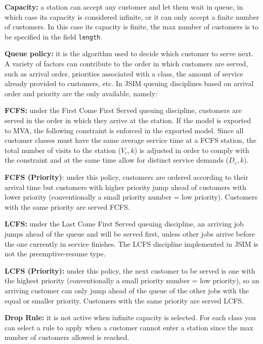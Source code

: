 \begin{itemize*}
\item \textbf{Capacity:} a station can accept any customer and let
them wait in queue, in which case its capacity is considered
infinite, or it can only accept a finite number of customers. In
this case its capacity is finite, the max number of customers is
to be specified in the field \texttt{length}.

\item \textbf{Queue policy:} it is the algorithm used to decide
which customer to serve next. A variety of factors can contribute
to the order in which customers are served, such as arrival order,
priorities associated with a class, the amount of service already
provided to customers, etc. In JSIM queuing disciplines based on
arrival order and priority are the only available, namely:
\begin{itemize*}
\item \textbf{FCFS:} under the First Come First Served queuing
discipline, customers are served in the order in which they arrive
at the station. If the model is exported to MVA, the following
constraint is enforced in the exported model. Since all customer
classes must have the same average service time at a FCFS station,
the total number of visits to the station ($V_c,k$) is adjusted in
order to comply with the constraint and at the same time allow for
distinct service demands ($D_c,k$). \item \textbf{FCFS
(Priority)}: under this policy, customers are ordered according to
their arrival time but customers with higher priority jump ahead
of customers with lower priority (conventionally a small priority
number = low priority). Customers with the same priority are
served FCFS. \item \textbf{LCFS:} under the Last Come First Served
queuing discipline, an arriving job jumps ahead of the queue and
will be served first, unless other jobs arrive before the one
currently in service finishes. The LCFS discipline implemented in
JSIM is not the preemptive-resume type. \item \textbf{LCFS
(Priority):} under this policy, the next customer to be served is
one with the highest priority (conventionally a small priority
number = low priority), so an arriving customer can only jump
ahead of the queue of the other jobs with the equal or smaller
priority. Customers with the same priority are served LCFS.
\end{itemize*}
\item \textbf{Drop Rule:} it is not active when infinite capacity
is selected. For each class you can select a rule to apply when a
customer cannot enter a station since the max number of customers
allowed is reached.
\end{itemize*}


